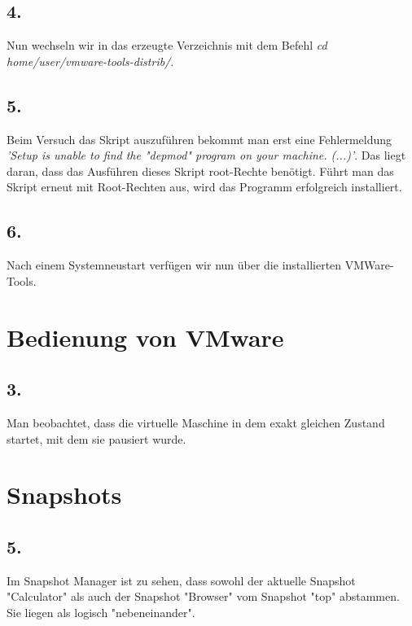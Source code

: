 \documentclass[
    fontsize=10pt,
    headings=medium,
    parskip=half,           %
    bibliography=totoc,
    numbers=noenddot,       %
    open=any,               %
    a4paper,
    ]{scrreprt}
\begin{document}
\subsection*{4.}
Nun wechseln wir in das erzeugte Verzeichnis mit dem Befehl \emph{cd home/user/vmware-tools-distrib/}.

\subsection*{5.}
Beim Versuch das Skript auszuführen bekommt man erst eine Fehlermeldung \emph{'Setup is unable to find the "depmod" program on your machine. (...)'}. Das liegt daran, dass das Ausführen dieses Skript root-Rechte benötigt. Führt man das Skript erneut mit Root-Rechten aus, wird das Programm erfolgreich installiert.

\subsection*{6.}
Nach einem Systemneustart verfügen wir nun über die installierten VMWare-Tools.

\section{Bedienung von VMware}

\subsection*{3.}
Man beobachtet, dass die virtuelle Maschine in dem exakt gleichen Zustand startet, mit dem sie pausiert wurde.

\section{Snapshots}

\subsection*{5.}
Im Snapshot Manager ist zu sehen, dass sowohl der aktuelle Snapshot "Calculator" als auch der Snapshot "Browser" vom Snapshot "top" abstammen. Sie liegen als logisch "nebeneinander".


\end{document}
